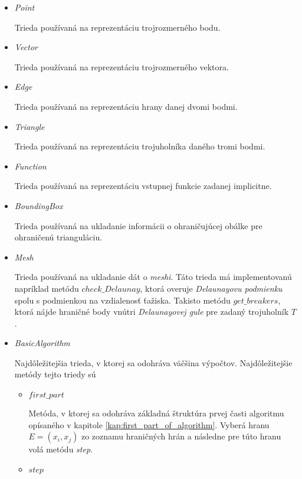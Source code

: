 \begin{itemize}
    \item{
        \textit{Point}

        Trieda používaná na reprezentáciu trojrozmerného bodu.
    }
    \item{
        \textit{Vector}
        
        Trieda používaná na reprezentáciu trojrozmerného vektora. 
    }
    \item{
        \textit{Edge}

        Trieda používaná na reprezentáciu hrany danej dvomi bodmi.
    }
    \item{
        \textit{Triangle}

        Trieda používaná na reprezentáciu trojuholníka daného tromi bodmi.
    }
    \item{
        \textit{Function}

        Trieda používaná na reprezentáciu vstupnej funkcie zadanej implicitne. 
    }
    \item{
        \textit{BoundingBox}

        Trieda používaná na ukladanie informácii o ohraničujúcej obálke pre ohraničenú trianguláciu.
    }
    \item{
        \textit{Mesh}

        Trieda používaná na ukladanie dát o \textit{meshi}. Táto trieda má implementovanú napríklad metódu
        $check\_Delaunay$, ktorá overuje \textit{Delaunayovu podmienku} spolu s podmienkou
        na vzdialenosť ťažiska. Takisto metódu $get\_breakers$, ktorá nájde hraničné body 
        vnútri \textit{Delaunayovej gule} pre zadaný trojuholník $T$.
    }
    \item{
        \textit{BasicAlgorithm}

        Najdôležitejšia trieda, v ktorej sa odohráva väčšina výpočtov. Najdôležitejšie metódy 
        tejto triedy sú
        \begin{itemize}
            \item{
                $first\_part$
                
                Metóda, v ktorej sa odohráva základná štruktúra prvej časti algoritmu opísaného v kapitole 
                \ref{kap:first_part_of_algorithm}. Vyberá hranu $E=(x_i, x_j)$ zo zoznamu hraničných 
                hrán a následne pre túto hranu volá metódu \textit{step}.
            }
            \item{
                $step$

}
\end{itemize}}
\end{itemize}

